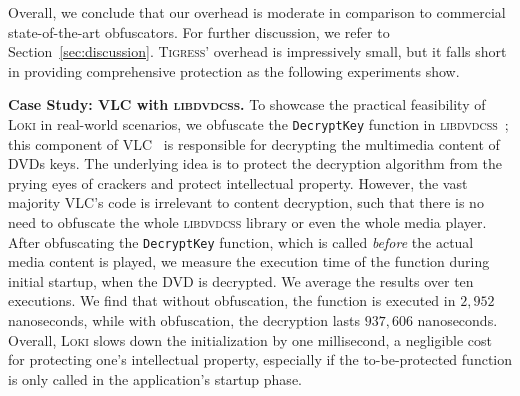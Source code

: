 \documentclass[letterpaper,twocolumn,10pt]{article}
\theoremstyle{customexample}
\theoremstyle{customexperiment}
\newcommand{\loki}{\textsc{Loki}\xspace}
\newcommand{\tigress}{\textsc{Tigress}\xspace}
\newcommand{\vlc}{\textsc{VLC}\xspace}
\newcommand{\libdvdcss}{\textsc{libdvdcss}\xspace}
\begin{document}
Overall, we conclude that our overhead is moderate in comparison to commercial state-of-the-art obfuscators. For further discussion, we refer to Section~\ref{sec:discussion}. 
\tigress' overhead is impressively small, but it falls short in providing comprehensive protection as the following experiments show.

\textbf{Case Study: \vlc with \libdvdcss.} To showcase the practical feasibility of \loki in real-world scenarios, we obfuscate the \texttt{DecryptKey} function in \libdvdcss~\cite{libdvdcss}; this component of \vlc~\cite{vlc} is responsible for decrypting the multimedia content of DVDs keys. The underlying idea is to protect the decryption algorithm from the prying eyes of crackers and protect intellectual property. 
However, the vast majority \vlc's code is irrelevant to content decryption, such that there is no need to obfuscate the whole \libdvdcss library or even the whole media player.
After obfuscating the \texttt{DecryptKey} function, which is called \emph{before} the actual media content is played, we measure the execution time of the function during initial startup, when the DVD is decrypted. We average the results over ten executions. We find that without obfuscation, the function is executed in $2,952$ nanoseconds, while with obfuscation, the decryption lasts $937,606$ nanoseconds. Overall, \loki slows down the initialization by one millisecond, a negligible cost for protecting one's intellectual property, especially if the to-be-protected function is only called in the application's startup phase.
\end{document}
